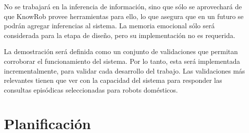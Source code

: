 No se trabajará en la inferencia de información, sino que sólo se aprovechará de que KnowRob provee herramientas para ello, lo que asegura que en un futuro se podrán agregar inferencias al sistema. La memoria emocional sólo será considerada para la etapa de diseño, pero su implementación no es requerida.


La demostración será definida como un conjunto de validaciones que permitan corroborar el funcionamiento del sistema. Por lo tanto, esta será implementada incrementalmente, para validar cada desarrollo del trabajo. Las validaciones más relevantes tienen que ver con la capacidad del sistema para responder las consultas episódicas seleccionadas para robots domésticos.








\section{Planificación}

